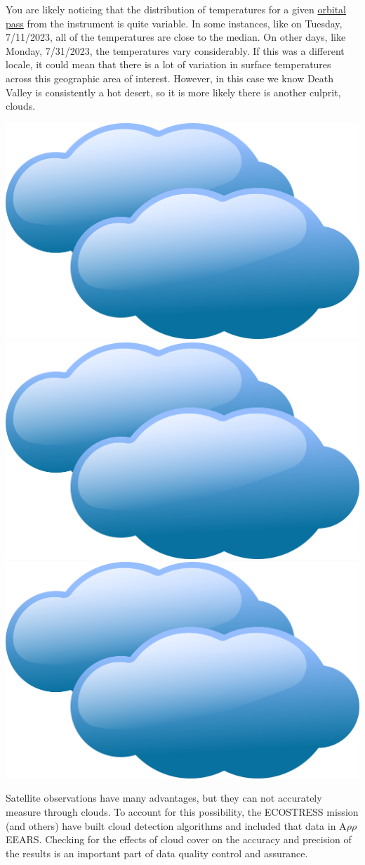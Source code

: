 \documentclass[oneside,a4paper,11pt,explicit]{book}
\begin{document}
\begin{tcolorbox}[colback=yellow!5!white,colframe=IceCreamLeaf,title=\textbf{Cloudy Conditions}]
You are likely noticing that the distribution of temperatures for a given \href{https://en.wikipedia.org/wiki/Orbital_pass}{orbital pass} from the instrument is quite variable. In some instances, like on Tuesday, 7/11/2023, all of the temperatures are close to the median. On other days, like Monday, 7/31/2023, the temperatures vary considerably. If this was a different locale, it could mean that there is a lot of variation in surface temperatures across this geographic area of interest. However, in this case we know Death Valley is consistently a hot desert, so it is more likely there is another culprit, clouds.

\vspace{1em}

\centerline{\includegraphics[width=.33\textwidth]{Clouds.png} \includegraphics[width=.33\textwidth]{Clouds.png} \includegraphics[width=.33\textwidth]{Clouds.png}}

\vspace{1em}

Satellite observations have many advantages, but they can not accurately measure through clouds. To account for this possibility, the ECOSTRESS mission (and others) have built cloud detection algorithms and included that data in A$\rho\rho$EEARS. Checking for the effects of cloud cover on the accuracy and precision of the results is an important part of data quality control and assurance. 
\end{tcolorbox}
\end{document}
